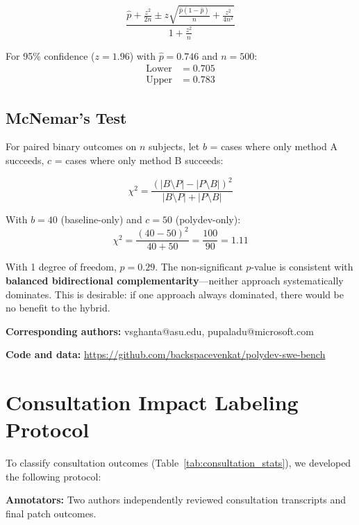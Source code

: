 \documentclass[11pt,a4paper]{article}
\begin{document}
\begin{equation}
\frac{\hat{p} + \frac{z^2}{2n} \pm z\sqrt{\frac{\hat{p}(1-\hat{p})}{n} + \frac{z^2}{4n^2}}}{1 + \frac{z^2}{n}}
\end{equation}

For 95\% confidence ($z = 1.96$) with $\hat{p} = 0.746$ and $n = 500$:
\begin{align}
\text{Lower} &= 0.705 \\
\text{Upper} &= 0.783
\end{align}

\subsection{McNemar's Test}

For paired binary outcomes on $n$ subjects, let $b$ = cases where only method A succeeds, $c$ = cases where only method B succeeds:

\begin{equation}
\chi^2 = \frac{(|B \setminus P| - |P \setminus B|)^2}{|B \setminus P| + |P \setminus B|}
\end{equation}

With $b = 40$ (baseline-only) and $c = 50$ (polydev-only):
\begin{equation}
\chi^2 = \frac{(40 - 50)^2}{40 + 50} = \frac{100}{90} = 1.11
\end{equation}

With 1 degree of freedom, $p = 0.29$. The non-significant $p$-value is consistent with \textbf{balanced bidirectional complementarity}---neither approach systematically dominates. This is desirable: if one approach always dominated, there would be no benefit to the hybrid.

\vspace{1em}
\noindent\textbf{Corresponding authors:} vsghanta@asu.edu, pupaladu@microsoft.com

\noindent\textbf{Code and data:} \url{https://github.com/backspacevenkat/polydev-swe-bench}

\section{Consultation Impact Labeling Protocol}
\label{sec:labeling}

To classify consultation outcomes (Table~\ref{tab:consultation_stats}), we developed the following protocol:

\textbf{Annotators:} Two authors independently reviewed consultation transcripts and final patch outcomes.
\end{document}
